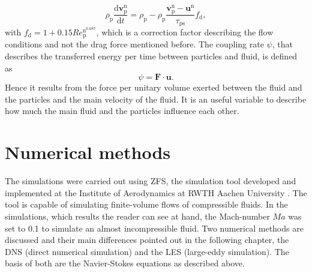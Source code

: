 \documentclass[11pt,a4paper,openany,oneside,parskip=half*]{article}
\renewcommand*\vec[1]{\boldsymbol{#1}}
\begin{document}
\nomenclature[rvp]{$\vec{v}_\mathrm{p}$}{Particle velocity vector}
\begin{equation}
\rho_\mathrm{p}\frac{\mathrm{d}\vec{v}_\mathrm{p}^\mathrm{n}}{\mathrm{d}t} = \rho_\mathrm{p}-\rho_\mathrm{p}\frac{\vec{v}_\mathrm{p}^\mathrm{n}-\vec{u}^\mathrm{n}}{\tau_\mathrm{ps}}f_\mathrm{d},
\end{equation}
with $f_\mathrm{d} = 1+0.15Re_\mathrm{p}^\mathrm{n^{0.687}}$, which is a correction factor describing the flow conditions and not the drag force mentioned before.
\newline
The coupling rate $\psi$, that describes the transferred energy per time between particles and fluid, is defined as
\begin{equation}
\psi = \vec{F} \cdot \vec{u}. 
\end{equation}
Hence it results from the force per unitary volume exerted between the fluid and the particles and the main velocity of the fluid.
It is an useful variable to describe how much the main fluid and the particles influence each other.
\pagebreak
\section{Numerical methods} %
The simulations were carried out using ZFS, the simulation tool developed and implemented at the Institute of Aerodynamics at RWTH Aachen University 
\cite{anAdaptiveMultilevelMultigridFormulationForCartesianHierarchicalGridMethods} \cite{aStrictlyConservativeCartesianCutCellMethodForCompressibleViscousFlowsOnAdaptiveGrids}. 
The tool is capable of simulating finite-volume flows of compressible fluids. In the simulations, which results the reader can see at hand, the Mach-number $Ma$ was set to 0.1 to simulate an almost incompressible fluid.
\newline
Two numerical methods are discussed and their main differences pointed out in the following chapter, the DNS (direct numerical simulation) and the LES (large-eddy simulation). The basis of both are the Navier-Stokes equations as described above.
\end{document}
